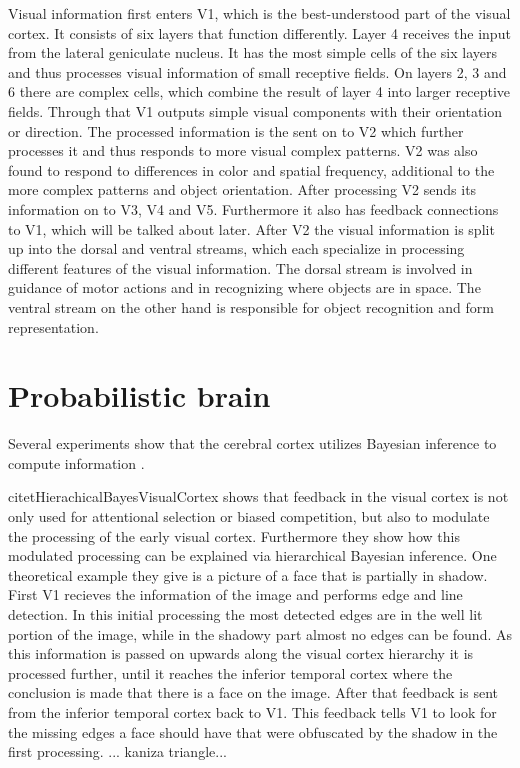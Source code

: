 Visual information first enters V1, which is the best-understood part of the visual cortex. It consists of six layers that function differently. Layer 4 receives the input from the lateral geniculate nucleus. It has the most simple cells of the six layers and thus processes visual information of small receptive fields. On layers 2, 3 and 6 there are complex cells, which combine the result of layer 4 into larger receptive fields. Through that V1 outputs simple visual components with their orientation or direction. The processed information is the sent on to V2 which further processes it and thus responds to more visual complex patterns. V2 was also found to respond to differences in color and spatial frequency, additional to the more complex patterns and object orientation. After processing V2 sends its information on to V3, V4 and V5. Furthermore it also has feedback connections to V1, which will be talked about later. After V2 the visual information is split up into the dorsal and ventral streams, which each specialize in processing different features of the visual information. The dorsal stream is involved in guidance of motor actions and in recognizing where objects are in space. The ventral stream on the other hand is responsible for object recognition and form representation.
\citep{visualCortexBook}

\section{Probabilistic brain}

Several experiments show that the cerebral
cortex utilizes Bayesian inference to compute information  \citep{neuralSubstrate, HierachicalBayesVisualCortex, anatomyOfInference, neuralImplementationOfBayesionInferenceSensoryMotor}.

citet{HierachicalBayesVisualCortex} shows that feedback in the visual cortex is not only used for attentional selection or biased competition, but also to modulate the processing of the early visual cortex. Furthermore they show how this modulated processing can be explained via hierarchical Bayesian inference. One theoretical example they give is a picture of a face that is partially in shadow. First V1 recieves the information of the image and performs edge and line detection. In this initial processing the most detected edges are in the well lit portion of the image, while in the shadowy part almost no edges can be found. As this information is passed on upwards along the visual cortex hierarchy it is processed further, until it reaches the inferior temporal cortex where the conclusion is made that there is a face on the image. After that feedback is sent from the inferior temporal cortex back to V1. This feedback tells V1 to look for the missing edges a face should have that were obfuscated by the shadow in the first processing.
... kaniza triangle...

